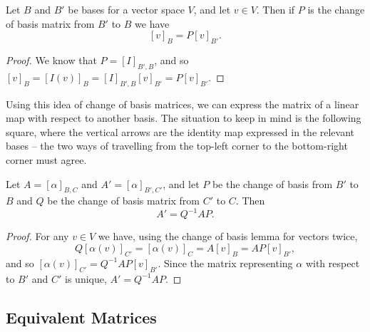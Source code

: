\documentclass[a4paper]{scrartcl}
\begin{document}
\begin{lemma}
    Let $B$ and $B'$ be bases for a vector space $V$, and let $v \in V$. Then if $P$ is the change of basis matrix from $B'$ to $B$ we have
    $$
    [v]_{B} = P[v]_{B'}.
    $$
\end{lemma}
\begin{proof}
    We know that $P = [I]_{B', B}$, and so $[v]_B = [I(v)]_B = [I]_{B', B} [v]_{B'} = P[v]_{B'}$.
\end{proof}

Using this idea of change of basis matrices, we can express the matrix of a linear map with respect to another basis. The situation to keep in mind is the following square, where the vertical arrows are the identity map expressed in the relevant bases -- the two ways of travelling from the top-left corner to the bottom-right corner must agree.
\begin{center}
\end{center}

\begin{proposition}
    Let $A = [\alpha]_{B, C}$ and $A' = [\alpha]_{B', C'}$, and let $P$ be the change of basis from $B'$ to $B$ and $Q$ be the change of basis matrix from $C'$ to $C$. Then
    $$
    A' = Q^{-1} AP.
    $$
\end{proposition}
\begin{proof}
    For any $v \in V$ we have, using the change of basis lemma for vectors twice,
    $$
    Q [\alpha(v)]_{C'} = [\alpha(v)]_C = A [v]_B = AP[v]_{B'},
    $$
    and so $[\alpha(v)]_{C'} = Q^{-1}AP [v]_{B'}$. Since the matrix representing $\alpha$ with respect to $B'$ and $C'$ is unique, $A' = Q^{-1}AP$.
\end{proof}

\subsection{Equivalent Matrices}
\end{document}
